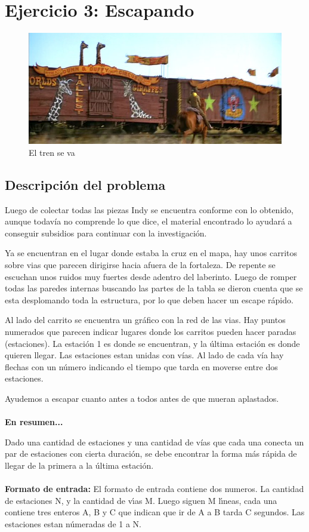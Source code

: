 \section{Ejercicio 3: Escapando}

  \begin{figure}[H]
    \begin{center}
      \includegraphics[width=0.4\columnwidth]{imagenes/tren.jpg}
      \caption{El tren se va}
    \end{center}
  \end{figure}


    \subsection{Descripción del problema}

        \par Luego de colectar todas las piezas Indy se encuentra conforme con lo obtenido, aunque todavía no comprende lo que dice, el material encontrado lo ayudará a conseguir subsidios para continuar con la investigación.
        \par Ya se encuentran en el lugar donde estaba la cruz en el mapa, hay unos carritos sobre vias que parecen dirigirse hacia afuera de la fortaleza. De repente se escuchan unos ruidos muy fuertes desde adentro del laberinto. Luego de romper todas las paredes internas buscando las partes de la tabla se dieron cuenta que se esta desplomando toda la estructura, por lo que deben hacer un escape rápido. \par Al lado del carrito se encuentra un gráfico con la red de las vias. Hay puntos numerados que parecen indicar lugares donde los carritos pueden hacer paradas (estaciones). La estación 1 es donde se encuentran, y la última estación es donde quieren llegar. Las estaciones estan unidas con vías. Al lado de cada vía hay flechas con un número indicando el tiempo que tarda en moverse entre dos estaciones.
        \par Ayudemos a escapar cuanto antes a todos antes de que mueran aplastados.
        \\~\\
        \textbf{En resumen...}
        \par Dado una cantidad de estaciones y una cantidad de vías que cada una conecta un par de estaciones con cierta duración, se debe encontrar la forma más rápida de llegar de la primera a la última estación.
        \\~\\
        \textbf{Formato de entrada:} El formato de entrada contiene dos numeros. La cantidad de estaciones N, y la cantidad de vı́as M. Luego siguen M lı́neas, cada una contiene tres enteros A, B y C que indican que ir de A a B tarda C segundos. Las estaciones estan númeradas de 1 a N.
        
